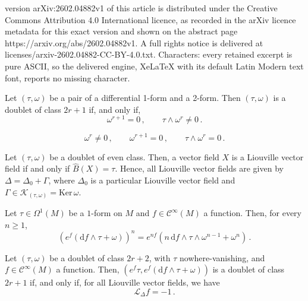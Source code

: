 \documentclass[10pt,a4paper]{amsart}
\def\Ker{\mathrm{Ker \,}}
\def\K{\mathcal{K}}
\newcommand{\Cinfty}{\mathscr{C}^\infty}
\newcommand{\Lie}{\mathscr{L}}
\renewcommand{\d}{\mathrm{d}}
\begin{document}
version arXiv:2602.04882v1 of this article is distributed under the Creative Commons Attribution 4.0 International licence, as recorded in the arXiv licence metadata for this exact version and shown on the abstract page https://arxiv.org/abs/2602.04882v1. A full rights notice is delivered at licenses/arxiv-2602.04882-CC-BY-4.0.txt. Characters: every retained excerpt is pure ASCII, so the delivered engine, XeLaTeX with its default Latin Modern text font, reports no missing character.
\begin{proposition}\label{conditions_odd_class}
   Let $(\tau,\omega)$ be a pair of a differential 1-form and a 2-form.  
Then $(\tau,\omega)$ is a doublet of class $2r+1$ if, and only if,
    \begin{equation}\label{eq:odd_conditions}
            \omega ^{r+1} = 0\,,
            \qquad
            \tau \wedge \omega^r \neq 0\,.
    \end{equation}
\end{proposition}

    \begin{equation}\label{eq:even_conditions}
\omega^r \neq 0\,, \qquad \omega ^{r+1}=0\,, \qquad \tau\wedge \omega^r=0\,.
    \end{equation}

\begin{proposition}\label{prop:liouville_structure}
    Let $(\tau,\omega)$ be a doublet of even class. Then, a vector field $X$ is a Liouville vector field if and only if $\widehat B(X) = \tau$. Hence, all Liouville vector fields are given by $\Delta=\Delta_0+\Gamma$, where $\Delta_0$ is a particular Liouville vector field and $\Gamma\in\K_{(\tau,\omega)}=\Ker\omega$.
\end{proposition}

\begin{lemma} 
\label{lemma_formula_ef_times_form}
Let $\tau\in\Omega^1(M)$ be a $1$-form on $M$ and $f\in \Cinfty(M)$ a function. 
Then, for every $n \geq 1$, 
$$ (e^f(\d f\wedge \tau +\omega))^n = e^{nf}(n\, \d f \wedge\tau\wedge\omega^{n-1}+\omega^n)\,.$$
\end{lemma}

\begin{proposition}\label{change_of_class_parity}
    Let $(\tau,\omega)$ be a doublet of class $2r+2$, with $\tau$ nowhere-vanishing, and $f\in\Cinfty(M)$ a function. Then, $(e^f\tau, e^f(\d f\wedge \tau+\omega))$ is a doublet of class $2r+1$ if, and only if, for all Liouville vector fields, we have $$\Lie _{\Delta} f=-1\,.$$
\end{proposition}
\end{document}
